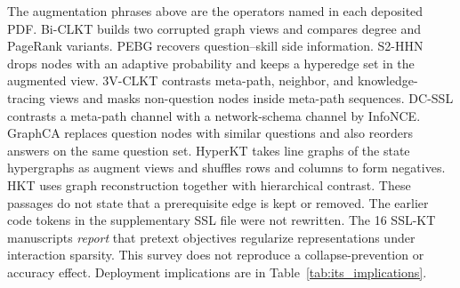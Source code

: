\documentclass[lettersize,journal]{IEEEtran}
\begin{document}
The augmentation phrases above are the operators named in each deposited PDF. Bi-CLKT builds two corrupted graph views and compares degree and PageRank variants. PEBG recovers question--skill side information. S2-HHN drops nodes with an adaptive probability and keeps a hyperedge set in the augmented view. 3V-CLKT contrasts meta-path, neighbor, and knowledge-tracing views and masks non-question nodes inside meta-path sequences. DC-SSL contrasts a meta-path channel with a network-schema channel by InfoNCE. GraphCA replaces question nodes with similar questions and also reorders answers on the same question set. HyperKT takes line graphs of the state hypergraphs as augment views and shuffles rows and columns to form negatives. HKT uses graph reconstruction together with hierarchical contrast. These passages do not state that a prerequisite edge is kept or removed. The earlier code tokens in the supplementary SSL file were not rewritten.
The 16 SSL-KT manuscripts \emph{report} that pretext objectives regularize representations under interaction sparsity. This survey does not reproduce a collapse-prevention or accuracy effect. Deployment implications are in Table~\ref{tab:its_implications}.
\end{document}
